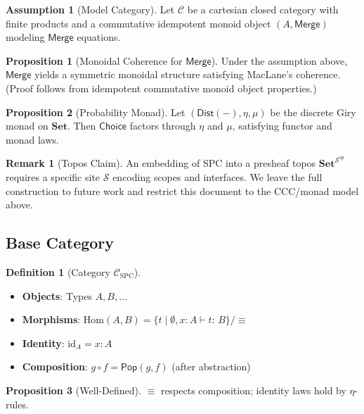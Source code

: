 \documentclass[12pt]{article}
\newcommand{\Entails}{\vdash}
\newcommand{\Types}{:\,}
\newcommand{\Pop}{\mathsf{Pop}}
\newcommand{\Merge}{\mathsf{Merge}}
\newcommand{\Choice}{\mathsf{Choice}}
\newcommand{\Dist}[1]{\mathsf{Dist}(#1)}
\newcommand{\Cat}{\mathcal{C}}
\newcommand{\SphereCat}{\mathcal{S}}
\theoremstyle{definition}
\newtheorem{definition}{Definition}
\newtheorem{proposition}{Proposition}
\newtheorem{remark}{Remark}
\newtheorem{assumption}{Assumption}
\begin{document}
\begin{assumption}[Model Category]
Let $\Cat$ be a cartesian closed category with finite products and a commutative idempotent monoid object $(A,\Merge)$ modeling $\Merge$ equations.
\end{assumption}

\begin{proposition}[Monoidal Coherence for $\Merge$]
Under the assumption above, $\Merge$ yields a symmetric monoidal structure satisfying MacLane's coherence. (Proof follows from idempotent commutative monoid object properties.)
\end{proposition}

\begin{proposition}[Probability Monad]
Let $(\Dist{-},\eta,\mu)$ be the discrete Giry monad on $\mathbf{Set}$. Then $\Choice$ factors through $\eta$ and $\mu$, satisfying functor and monad laws.
\end{proposition}

\begin{remark}[Topos Claim]
An embedding of SPC into a presheaf topos $\mathbf{Set}^{\SphereCat^{op}}$ requires a specific site $\SphereCat$ encoding scopes and interfaces. We leave the full construction to future work and restrict this document to the CCC/monad model above.
\end{remark}

\subsection{Base Category}
\begin{definition}[Category $\mathcal{C}_{\text{SPC}}$]
\begin{itemize}
\item \textbf{Objects}: Types $A, B, \ldots$
\item \textbf{Morphisms}: $\text{Hom}(A,B) = \{t \mid \emptyset, x:A \Entails t \Types B\} / {\equiv}$
\item \textbf{Identity}: $\text{id}_A = x : A$
\item \textbf{Composition}: $g \circ f = \Pop(g,f)$ (after abstraction)
\end{itemize}
\end{definition}

\begin{proposition}[Well-Defined]
$\equiv$ respects composition; identity laws hold by $\eta$-rules.
\end{proposition}
\end{document}
